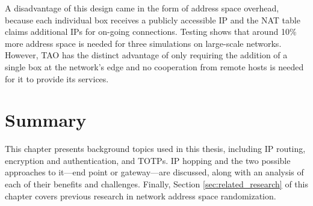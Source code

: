 \par A disadvantage of this design came in the form of address space overhead, because each individual box receives a publicly accessible \ac{IP} and the \ac{NAT} table claims additional \acp{IP} for on-going connections. Testing shows that around 10\% more address space is needed for three simulations on large-scale networks. However, \ac{TAO} has the distinct advantage of only requiring the addition of a single box at the network's edge and no cooperation from remote hosts is needed for it to provide its services.

\section{Summary}
\label{sec:background_summary}
\par This chapter presents background topics used in this thesis, including \ac{IP} routing, encryption and authentication, and \aclp{TOTP}. \ac{IP} hopping and the two possible approaches to it---end point or gateway---are discussed, along with an analysis of each of their benefits and challenges. Finally, Section \ref{sec:related_research} of this chapter covers previous research in network address space randomization.

